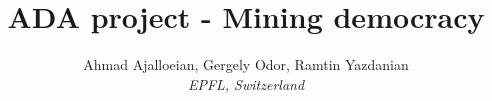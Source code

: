 \documentclass[9pt,conference,compsocconf]{IEEEtran}
\begin{document}
\title{ADA project - Mining democracy}

\author{
  Ahmad Ajalloeian, Gergely Odor, Ramtin Yazdanian\\
  \textit{EPFL, Switzerland}
}
\maketitle

%      


%




\end{document}
